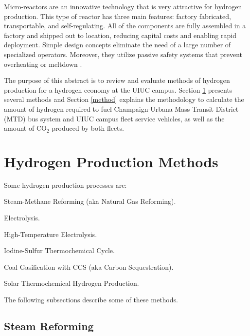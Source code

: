 \documentclass{anstrans}
\begin{document}
Micro-reactors are an innovative technology that is very attractive for hydrogen production. This type of reactor has three main features: factory fabricated, transportable, and self-regulating. All of the components are fully assembled in a factory and shipped out to location, reducing capital costs and enabling rapid deployment. Simple design concepts eliminate the need of a large number of specialized operators. Moreover, they utilize passive safety systems that prevent overheating or meltdown \cite{noauthor_ultimate_2019}.

The purpose of this abstract is to review and evaluate methods of hydrogen production for a hydrogen economy at the UIUC campus.
Section \ref{section:hydroprod} presents several methods and Section \ref{method} explains the methodology to calculate the amount of hydrogen required to fuel Champaign-Urbana Mass Transit District (MTD) bus system and UIUC campus fleet service vehicles, as well as the amount of CO$_2$ produced by both fleets.

\section{Hydrogen Production Methods}
\label{section:hydroprod}

Some hydrogen production processes are: 
\begin{description}[font=$\bullet$\scshape\bfseries]
	\item[] Steam-Methane Reforming (aka Natural Gas Reforming).
	\item[] Electrolysis.
	\item[] High-Temperature Electrolysis.
	\item[] Iodine-Sulfur Thermochemical Cycle.
	\item[] Coal Gasification with CCS (aka Carbon Sequestration).
	\item[] Solar Thermochemical Hydrogen Production.
\end{description}

The following subsections describe some of these methods.

\subsection{Steam Reforming}
\end{document}
